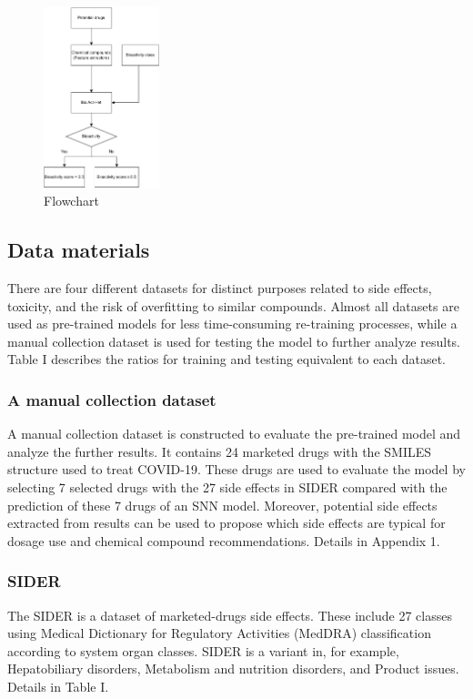 \documentclass[conference]{IEEEtran}
\begin{document}
\begin{figure}[htbp]
  \centering
  \includegraphics[width=0.3\textwidth]{flowchart.pdf}
  \caption{Flowchart}
\end{figure}

\subsection{Data materials}
There are four different datasets for distinct purposes related to side effects, toxicity, and the risk of overfitting to similar compounds. Almost all datasets are used as pre-trained models for less time-consuming re-training processes, while a manual collection dataset is used for testing the model to further analyze results. Table I describes the ratios for training and testing equivalent to each dataset.\\

\subsubsection{A manual collection dataset}
A manual collection dataset is constructed to evaluate the pre-trained model and analyze the further results. It contains 24 marketed drugs with the SMILES structure used to treat COVID-19. These drugs are used to evaluate the model by selecting 7 selected drugs with the 27 side effects in SIDER compared with the prediction of these 7 drugs of an SNN model. Moreover, potential side effects extracted from results can be used to propose which side effects are typical for dosage use and chemical compound recommendations. Details in Appendix 1.\\

\subsubsection{SIDER}
The SIDER is a dataset of marketed-drugs side effects. These include 27 classes using Medical Dictionary for Regulatory Activities (MedDRA) classification according to system organ classes. SIDER is a variant in, for example, Hepatobiliary disorders, Metabolism and nutrition disorders, and Product issues. Details in Table I.\\
\end{document}
